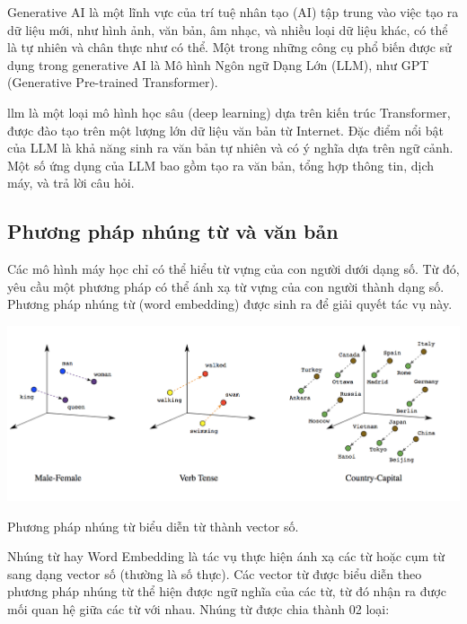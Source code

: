 \documentclass[a4paper, 12pt, openany]{book}
\begin{document}
Generative AI là một lĩnh vực của trí tuệ nhân tạo (AI) tập trung vào việc tạo ra dữ liệu mới, như hình ảnh, văn bản, âm nhạc, và nhiều loại dữ liệu khác, có thể là tự nhiên và chân thực như có thể. Một trong những công cụ phổ biến được sử dụng trong generative AI là Mô hình Ngôn ngữ Dạng Lớn (LLM), như GPT (Generative Pre-trained Transformer).

\acl{llm} là một loại mô hình học sâu (deep learning) dựa trên kiến trúc Transformer, được đào tạo trên một lượng lớn dữ liệu văn bản từ Internet. Đặc điểm nổi bật của LLM là khả năng sinh ra văn bản tự nhiên và có ý nghĩa dựa trên ngữ cảnh. Một số ứng dụng của LLM bao gồm tạo ra văn bản, tổng hợp thông tin, dịch máy, và trả lời câu hỏi.

\subsection{Phương pháp nhúng từ và văn bản}

Các mô hình máy học chỉ có thể hiểu từ vựng của con người dưới dạng số. Từ đó, yêu cầu một phương pháp có thể
ánh xạ từ vựng của con người thành dạng số. Phương pháp nhúng từ (word embedding)
được sinh ra để giải quyết tác vụ này.

\begin{minipage}{\linewidth}
    \captionsetup{type=figure}
    \centering
    \includegraphics[width=\linewidth]{./assets/images/word_embedding.png}
    \caption{Phương pháp nhúng từ biểu diễn từ thành vector số.}
\end{minipage}
\vspace{0.5cm}

Nhúng từ hay Word Embedding là tác vụ thực hiện ánh xạ các từ hoặc cụm từ sang dạng vector
số (thường là số thực). Các vector từ được biểu diễn theo phương pháp nhúng từ thể hiện
được ngữ nghĩa của các từ, từ đó nhận ra được mối quan hệ giữa các từ với nhau. Nhúng
từ được chia thành 02 loại:
\end{document}
